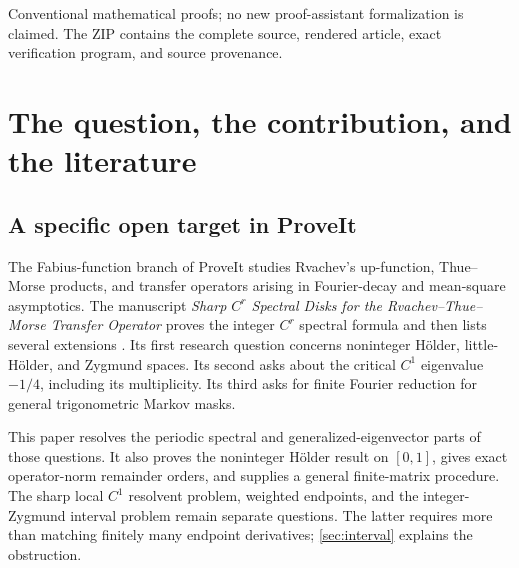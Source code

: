 \documentclass[11pt,a4paper]{article}
\numberwithin{equation}{section}
\theoremstyle{definition}
\theoremstyle{remark}
\begin{document}
\begin{titlepage}
\begin{abstract}
The argument applies to every nonnegative trigonometric Markov mask for
every integer dilation $b\ge2$. It determines the full Fredholm essential
disk, the point spectrum, all exterior generalized eigenspaces, and the
entire boundary Jordan structure. Each finite-matrix Jordan block on the
critical circle gains one place in the big space; in the little space
the finite-matrix block is unchanged. This yields exact residual power
orders, including the same critical polynomial loss in both spaces.
For the Rvachev operator, the critical classical $C^1$ generalized
eigenspace is exactly two-dimensional and has no nontrivial Jordan chains.
Classical spectral-radius and approximation results are credited explicitly;
publication-level priority is not asserted. All new spectral arguments are
proved here, with finite algebra checked separately by exact arithmetic.
\end{abstract}
\vfill
{\small\color{grayink} Conventional mathematical proofs; no new proof-assistant
formalization is claimed. The ZIP contains the complete source, rendered
article, exact verification program, and source provenance.}
\end{titlepage}

\hypersetup{pageanchor=true}
{\small\setlength{\parskip}{0pt}\tableofcontents}
\clearpage
{}

\section{The question, the contribution, and the literature}
\label{sec:position}

\subsection{A specific open target in ProveIt}
The Fabius-function branch of ProveIt studies Rvachev's up-function,
Thue--Morse products, and transfer operators arising in Fourier-decay and
mean-square asymptotics. The manuscript \emph{Sharp $C^r$ Spectral Disks
for the Rvachev--Thue--Morse Transfer Operator} proves the integer
$C^r$ spectral formula and then lists several extensions
\cite{repo-cr,repo-index}. Its first research question concerns noninteger
H\"older, little-H\"older, and Zygmund spaces. Its second asks about
the critical $C^1$ eigenvalue $-1/4$, including its multiplicity. Its third
asks for finite Fourier reduction for general trigonometric Markov masks.

This paper resolves the periodic spectral and generalized-eigenvector
parts of those questions. It also proves the noninteger H\"older result
on $[0,1]$, gives exact operator-norm remainder orders, and supplies a
general finite-matrix procedure. The sharp local $C^1$ resolvent problem,
weighted endpoints, and the integer-Zygmund interval problem remain
separate questions. The latter requires more than matching finitely many
endpoint derivatives; \cref{sec:interval} explains the obstruction.
\end{document}

